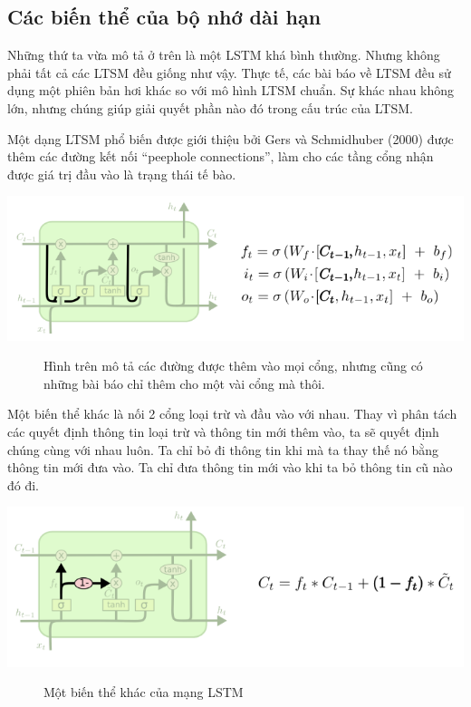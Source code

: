 \subsection{Các biến thể của bộ nhớ dài hạn}
Những thứ ta vừa mô tả ở trên là một LSTM khá bình thường. Nhưng không phải tất cả các LTSM đều giống như vậy. Thực tế, các bài báo về LTSM đều sử dụng một phiên bản hơi khác so với mô hình LTSM chuẩn. Sự khác nhau không lớn, nhưng chúng giúp giải quyết phần nào đó trong cấu trúc của LTSM.\par
Một dạng LTSM phổ biến được giới thiệu bởi Gers và Schmidhuber (2000) được thêm các đường kết nối “peephole connections”, làm cho các tầng cổng nhận được giá trị đầu vào là trạng thái tế bào.
\begin{center}
    \includegraphics[scale=.5]{image/chapter6/bth1.png}
    \begin{figure}[htp]
    \begin{center}
     
    \end{center}
    \caption{Hình trên mô tả các đường được thêm vào mọi cổng, nhưng cũng có những bài báo chỉ thêm cho một vài cổng mà thôi.}
    \end{figure}
\end{center}
Một biến thể khác là nối 2 cổng loại trừ và đầu vào với nhau. Thay vì phân tách các quyết định thông tin loại trừ và thông tin mới thêm vào, ta sẽ quyết định chúng cùng với nhau luôn. Ta chỉ bỏ đi thông tin khi mà ta thay thế nó bằng thông tin mới đưa vào. Ta chỉ đưa thông tin mới vào khi ta bỏ thông tin cũ nào đó đi.
\begin{center}
    \includegraphics[scale=.5]{image/chapter6/bth2.png}
    \begin{figure}[htp]
    \begin{center}
     
    \end{center}
    \caption{Một biến thể khác của mạng LSTM}
    \end{figure}
\end{center}
